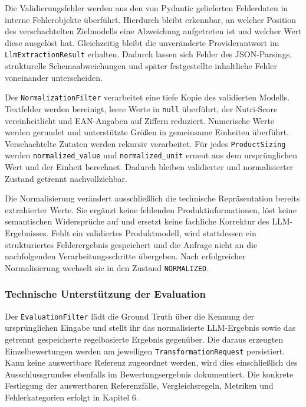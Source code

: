 Die Validierungsfehler werden aus den von Pydantic gelieferten Fehlerdaten in interne Fehlerobjekte überführt. Hierdurch bleibt erkennbar, an welcher Position des 
verschachtelten Zielmodells eine Abweichung aufgetreten ist und welcher Wert diese ausgelöst hat. Gleichzeitig bleibt die unveränderte Providerantwort im 
\texttt{LlmExtractionResult} erhalten. Dadurch lassen sich Fehler des JSON-Parsings, strukturelle Schemaabweichungen und später festgestellte inhaltliche Fehler 
voneinander unterscheiden.

Der \texttt{NormalizationFilter} verarbeitet eine tiefe Kopie des validierten Modells. Textfelder werden bereinigt, leere Werte in \texttt{null} überführt, der 
Nutri-Score vereinheitlicht und EAN-Angaben auf Ziffern reduziert. Numerische Werte werden gerundet und unterstützte Größen in gemeinsame Einheiten überführt. 
Verschachtelte Zutaten werden rekursiv verarbeitet. Für jedes \texttt{ProductSizing} werden \texttt{normalized\_value} und \texttt{normalized\_unit} erneut aus 
dem ursprünglichen Wert und der Einheit berechnet. Dadurch bleiben validierter und normalisierter Zustand getrennt nachvollziehbar.

Die Normalisierung verändert ausschließlich die technische Repräsentation bereits extrahierter Werte. Sie ergänzt keine fehlenden Produktinformationen, löst keine 
semantischen Widersprüche auf und ersetzt keine fachliche Korrektur des LLM-Ergebnisses. Fehlt ein validiertes Produktmodell, wird stattdessen ein strukturiertes 
Fehlerergebnis gespeichert und die Anfrage nicht an die nachfolgenden Verarbeitungsschritte übergeben. Nach erfolgreicher Normalisierung wechselt sie in den 
Zustand \texttt{NORMALIZED}.

\subsubsection{Technische Unterstützung der Evaluation}

Der \texttt{EvaluationFilter} lädt die Ground Truth über die Kennung der ursprünglichen Eingabe und stellt ihr das normalisierte LLM-Ergebnis sowie das getrennt 
gespeicherte regelbasierte Ergebnis gegenüber. Die daraus erzeugten Einzelbewertungen werden am jeweiligen \texttt{TransformationRequest} persistiert. Kann keine 
auswertbare Referenz zugeordnet werden, wird dies einschließlich des Ausschlussgrundes ebenfalls im Bewertungsergebnis dokumentiert. Die konkrete Festlegung der 
auswertbaren Referenzfälle, Vergleichsregeln, Metriken und Fehlerkategorien erfolgt in Kapitel 6.

